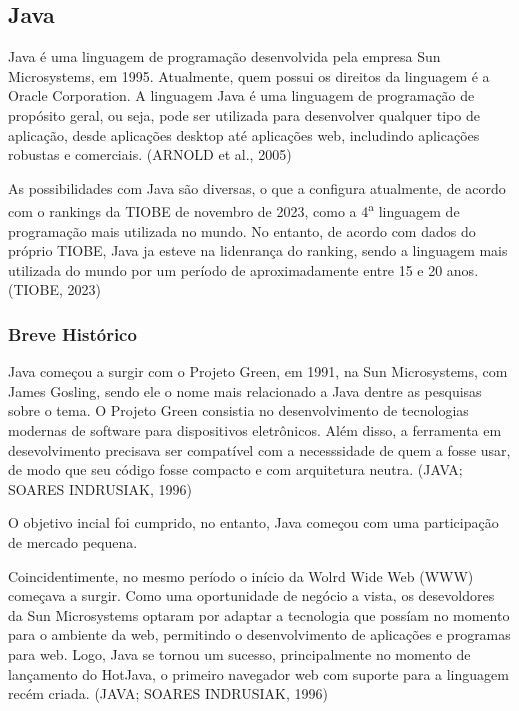 \documentclass[a4paper,12pt]{article}
\begin{document}
\subsection{Java}
Java é uma linguagem de programação desenvolvida pela empresa Sun Microsystems, em 1995. Atualmente, quem possui os direitos da 
linguagem é a Oracle Corporation. A linguagem Java é uma linguagem de programação de propósito geral, ou seja, pode ser utilizada 
para desenvolver qualquer tipo de aplicação, desde aplicações desktop até aplicações web, includindo aplicações robustas e comerciais. (ARNOLD et al., 2005)

As possibilidades com Java são diversas, o que a configura atualmente, de acordo com o rankings da TIOBE de novembro de 2023, como a 4\textsuperscript{a} linguagem de programação
mais utilizada no mundo. No entanto, de acordo com dados do próprio TIOBE, Java ja esteve na lidenrança do ranking, sendo a linguagem mais utilizada do mundo
por um período de aproximadamente entre 15 e 20 anos. (TIOBE, 2023)

\subsubsection{Breve Histórico}
Java começou a surgir com o Projeto Green, em 1991, na Sun Microsystems, com James Gosling, sendo ele o nome mais relacionado a Java dentre as pesquisas 
sobre o tema. O Projeto Green consistia no desenvolvimento de tecnologias modernas de software para dispositivos eletrônicos. Além disso, a ferramenta
em desevolvimento precisava ser compatível com a necesssidade de quem a fosse usar, de modo que seu código fosse compacto e com arquitetura neutra. (JAVA; SOARES INDRUSIAK, 1996)

O objetivo incial foi cumprido, no entanto, Java começou com uma participação de mercado pequena. 

Coincidentimente, no mesmo período o início da Wolrd Wide Web (WWW) começava a surgir. Como uma oportunidade de negócio a vista, os desevoldores da Sun
Microsystems optaram por adaptar a tecnologia que possíam no momento para o ambiente da web, permitindo o desenvolvimento de aplicações e programas para web.
Logo, Java se tornou um sucesso, principalmente no momento de lançamento do HotJava, o primeiro navegador web com suporte para a linguagem recém criada. (JAVA; SOARES INDRUSIAK, 1996)
\end{document}
